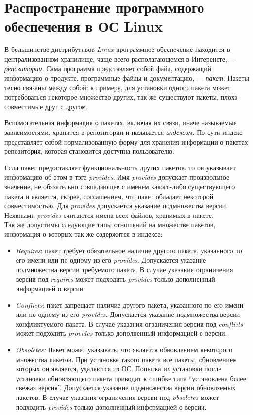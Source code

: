 \section{Распространение программного обеспечения в ОС Linux}

В большинстве дистрибутивов \textit{Linux} программное обеспечение находится
в централизованном хранилище, чаще всего располагающемся в Интеренете, 
--- \textit{репозитории}. Сама программа представляет собой файл, содержащий
информацию о продукте, программные файлы и документацию, --- \textit{пакет}. 
Пакеты тесно связаны между собой: к примеру, для установки одного пакета
может потребоваться некоторое множество других, так же существуют пакеты, плохо
совместимые друг с другом. 

Вспомогательная информация о пакетах, включая их связи, иначе называемые зависимостями,
хранится в репозитории и называется \textit{индексом}.
По сути индекс представляет собой нормализованную форму для хранения информации о пакетах 
репозитория, которая становится доступна пользователю.

Если пакет предоставляет 
функциональность других пакетов, то он указывает информацию об этом в тэге \textit{provides}.
Имя \textit{provides} допускает произвольное значение, не обязательно совпадающее с
именем какого-либо существующего  пакета и является, скорее, соглашением, что пакет
обладает некоторой совместимостью. Для \textit{provides} допускается указание подмножества 
версии. Неявными \textit{provides} считаются имена всех файлов, хранимых в пакете.\\

Так же допустимы следующие типы отношений на множестве пакетов, информация о которых так
же содержится в индексе\cite{deepsolver_ta}:
\begin{itemize}
\item{\textit{Requires}: пакет требует обязательное наличие другого пакета, указанного
по его имени или по одному из его \textit{provides}. Допускается указание 
подмножества версии требуемого пакета. В случае указания ограничения версии
под \textit{requires} может подходить \textit{provides} только дополненный информацией
о версии.}
\item{\textit{Conflicts}: пакет запрещает наличие другого пакета, указанного по его имени
 или по одному из его \textit{provides}. Допускается указание подмножества
версии конфликтуемого пакета. В случае указания ограничения версии
под \textit{conflicts} может подходить \textit{provides} только дополненный информацией
о версии.}
\item{\textit{Obsoletes:} Пакет может указывать, что является обновлением некоторого
множества пакетов. При установке такого пакета все пакеты, обновлением
которых он является, удаляются из ОС. Попытка их установки после
установки обновляющего пакета приводит к ошибке типа ``установлена
более свежая версия''. Допускается указание подмножества версии обновляемых
пакетов. В случае указания ограничения версии под \textit{obsoletes} может
подходить \textit{provides} только дополненный информацией о версии.}
\end{itemize}

